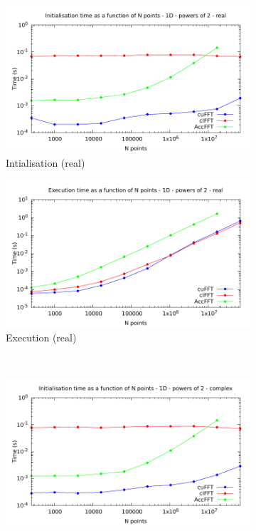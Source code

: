 \documentclass[12pt, a4paper]{article}
\begin{document}
\begin{figure}[H]
\captionsetup{width=0.8\linewidth}
\centering
\begin{subfigure}{.5\textwidth}
\centering
\includegraphics[width=.9\linewidth]{graphs/fft-1d-pow2-r-init.pdf}
\caption{Intialisation (real)}
\label{FFTPOW21DRI}
\end{subfigure}%
\begin{subfigure}{.5\textwidth}
\centering
\includegraphics[width=.9\linewidth]{graphs/fft-1d-pow2-r-exec.pdf}
\caption{Execution (real)}
\label{FFTPOW21DRE}
\end{subfigure}\\
\begin{subfigure}{.5\textwidth}
\centering
\includegraphics[width=.9\linewidth]{graphs/fft-1d-pow2-c-init.pdf}

\end{subfigure}
\end{figure}
\end{document}
